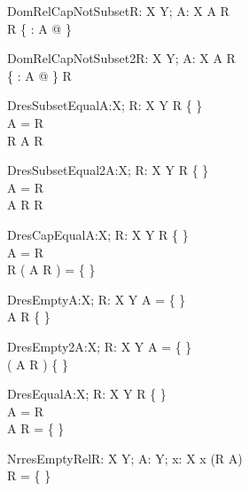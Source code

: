 \begin{theorem}{DomRelCapNotSubset}{R: X \rel Y; A: \power X}
A \subseteq \dom R \\
\dom R \subset \dom \{ \anything : A @ \anything \}
\end{theorem}

\begin{theorem}{DomRelCapNotSubset2}{R: X \rel Y; A: \power X}
A \subseteq \dom R \\
\lnot \dom \{ \anything : A @ \anything \} \subseteq \dom R
\end{theorem}


\begin{theorem}{DresSubsetEqual}{A:\power X; R: X \rel Y}
R \neq \{ \} \\
A = \dom R \\
R \subset A \dres R 
\end{theorem}

\begin{theorem}{DresSubsetEqual2}{A:\power X; R: X \rel Y}
R \neq \{ \} \\
A = \dom R \\
A \dres R \subset R 
\end{theorem}

\begin{theorem}{DresCapEqual}{A:\power X; R: X \rel Y}
R \neq \{ \} \\
A = \dom R \\
R \cap ( A \dres R ) = \{ \}
\end{theorem}

\begin{theorem}{DresEmpty}{A:\power X; R: X \rel Y}
A = \{ \} \\
A \dres R \neq \{ \}
\end{theorem}

\begin{theorem}{DresEmpty2}{A:\power X; R: X \rel Y}
A = \{ \} \\
\dom ( A \dres R ) \neq \{ \}
\end{theorem}

\begin{theorem}{DresEqual}{A:\power X; R: X \rel Y}
R \neq \{ \} \\
A = \dom R \\
A \dres R = \{ \}
\end{theorem}


\begin{theorem}{NrresEmptyRel}{R: X \rel Y; A: \power Y; x: X}
x \in \dom (R \nrres A) \\
R = \{ \}
\end{theorem}

